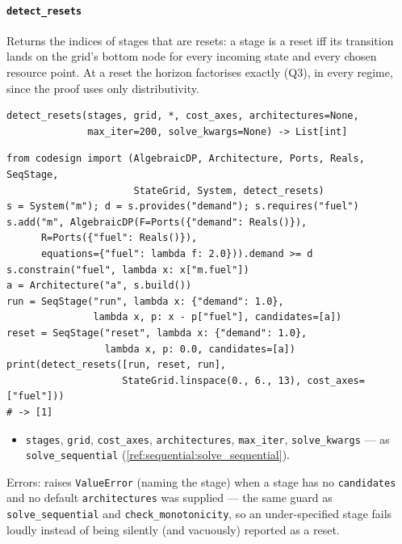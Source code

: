 \documentclass[11pt,a4paper]{article}
\begin{document}
\paragraph{\texttt{detect\_resets}}\label{ref:sequential:detect_resets}
Returns the indices of stages that are resets: a stage is a reset iff its
transition lands on the grid's bottom node for every incoming state and
every chosen resource point. At a reset the horizon factorises exactly (Q3),
in every regime, since the proof uses only distributivity.
\begin{lstlisting}
detect_resets(stages, grid, *, cost_axes, architectures=None,
              max_iter=200, solve_kwargs=None) -> List[int]
\end{lstlisting}
\begin{lstlisting}
from codesign import (AlgebraicDP, Architecture, Ports, Reals, SeqStage,
                      StateGrid, System, detect_resets)
s = System("m"); d = s.provides("demand"); s.requires("fuel")
s.add("m", AlgebraicDP(F=Ports({"demand": Reals()}),
      R=Ports({"fuel": Reals()}),
      equations={"fuel": lambda f: 2.0})).demand >= d
s.constrain("fuel", lambda x: x["m.fuel"])
a = Architecture("a", s.build())
run = SeqStage("run", lambda x: {"demand": 1.0},
               lambda x, p: x - p["fuel"], candidates=[a])
reset = SeqStage("reset", lambda x: {"demand": 1.0},
                 lambda x, p: 0.0, candidates=[a])
print(detect_resets([run, reset, run],
                    StateGrid.linspace(0., 6., 13), cost_axes=["fuel"]))
# -> [1]
\end{lstlisting}
\begin{itemize}[nosep]
  \item \texttt{stages}, \texttt{grid}, \texttt{cost\_axes},
    \texttt{architectures}, \texttt{max\_iter}, \texttt{solve\_kwargs} ---
    as \texttt{solve\_sequential} (\ref{ref:sequential:solve_sequential}).
\end{itemize}
Errors: raises \texttt{ValueError} (naming the stage) when a stage has no
\texttt{candidates} and no default \texttt{architectures} was supplied ---
the same guard as \texttt{solve\_sequential} and \texttt{check\_monotonicity},
so an under-specified stage fails loudly instead of being silently (and
vacuously) reported as a reset.
\end{document}
